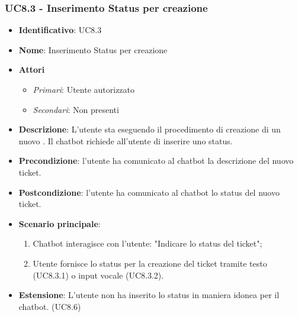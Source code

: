 \subsubsection{UC8.3 - Inserimento Status per creazione }
\begin{itemize}
	\item \textbf{Identificativo}: UC8.3
	\item \textbf{Nome}: Inserimento Status per creazione  
	\item \textbf{Attori}
	\begin{itemize} 
		\item \textit{Primari}: Utente autorizzato
		\item \textit{Secondari}: Non presenti
	\end{itemize}
	\item \textbf{Descrizione}: L'utente sta eseguendo il procedimento di creazione di un nuovo . Il chatbot richiede all'utente di inserire uno status.
	\item \textbf{Precondizione}: l'utente ha comunicato al chatbot la descrizione del nuovo ticket.
	\item \textbf{Postcondizione}: l'utente ha comunicato al chatbot lo status del nuovo ticket.
	\item \textbf{Scenario principale}: \begin{enumerate}
		\item Chatbot interagisce con l'utente: "Indicare lo status del ticket";
		\item Utente fornisce lo status per la creazione del ticket tramite testo (UC8.3.1) o input vocale (UC8.3.2).
	\end{enumerate}
	\item \textbf{Estensione}: L'utente non ha inserito lo status in maniera idonea per il chatbot.  (UC8.6)
\end{itemize}
